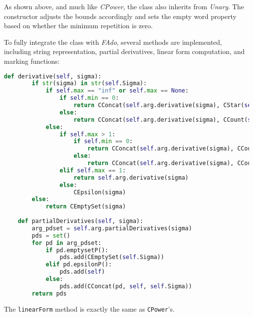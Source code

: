 As shown above, and much like \textit{CPower}, the class also inherits from \textit{Unary}. The constructor adjusts the bounds accordingly and sets the empty word property based on whether the minimum repetition is zero.

To fully integrate the class with \textit{FAdo}, several methods are implemented, including string representation, partial derivatives, linear form computation, and marking functions:

\begin{lstlisting}[language=Python]
	def derivative(self, sigma):
		if str(sigma) in str(self.Sigma):
			if self.max == "inf" or self.max == None:
				if self.min == 0:
					return CConcat(self.arg.derivative(sigma), CStar(self.arg, self.Sigma))
				else:
					return CConcat(self.arg.derivative(sigma), CCount(self.arg, self.min-1, self.max, sigma), self.Sigma)
			else:
				if self.max > 1:
					if self.min == 0:
						return CConcat(self.arg.derivative(sigma), CCount(self.arg, self.min, int(self.max), self.Sigma))
					else:
						return CConcat(self.arg.derivative(sigma), CCount(self.arg, self.min-1, int(self.max), self.Sigma))
				elif self.max == 1:
					return self.arg.derivative(sigma)
				else:
					CEpsilon(sigma)
		else:
			return CEmptySet(sigma)
		
	def partialDerivatives(self, sigma):
		arg_pdset = self.arg.partialDerivatives(sigma)
		pds = set()
		for pd in arg_pdset:
			if pd.emptysetP():
				pds.add(CEmptySet(self.Sigma))
			elif pd.epsilonP():
				pds.add(self)
			else:
				pds.add(CConcat(pd, self, self.Sigma))
		return pds
\end{lstlisting}

The \texttt{linearForm} method is exactly the same as \texttt{CPower}'s.


